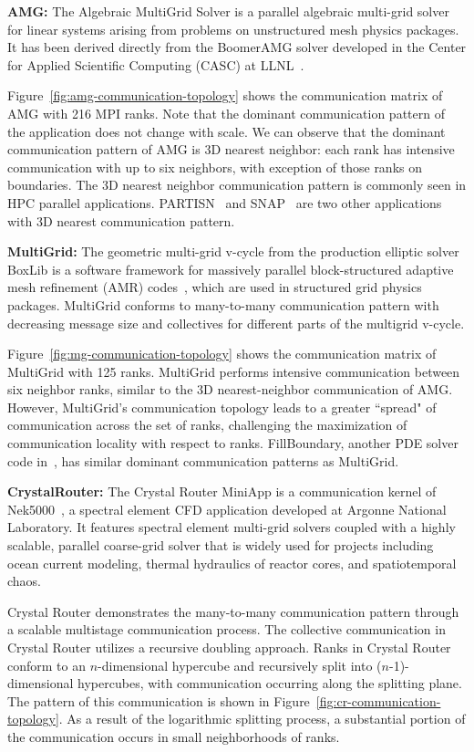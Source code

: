 \textbf{AMG:} The Algebraic MultiGrid Solver is a parallel algebraic multi-grid solver for linear systems arising from problems on unstructured mesh physics packages. It has been derived directly from the BoomerAMG solver developed in the Center for Applied Scientific Computing (CASC) at LLNL~\cite{amg}. 

Figure~\ref{fig:amg-communication-topology} shows the communication matrix of AMG with 216 MPI ranks. Note that the dominant communication pattern of the application does not change with scale. We can observe that the dominant communication pattern of AMG is 3D nearest neighbor: each rank has intensive communication with up to six neighbors, with exception of those ranks on boundaries. The 3D nearest neighbor communication pattern is commonly seen in HPC parallel applications. PARTISN~\cite{partisn} and SNAP~\cite{snap} are two other applications with 3D nearest communication pattern. 


\textbf{MultiGrid:} The geometric multi-grid v-cycle from the production elliptic solver BoxLib is a software framework for massively parallel block-structured adaptive mesh refinement (AMR) codes~\cite{boxlib}, which are used in structured grid physics packages. MultiGrid conforms to many-to-many communication pattern with decreasing message size and collectives for different parts of the multigrid v-cycle. 

Figure~\ref{fig:mg-communication-topology} shows the communication matrix of MultiGrid with 125 ranks. MultiGrid performs intensive communication between six neighbor ranks, similar to the 3D nearest-neighbor communication of AMG. However, MultiGrid's communication topology leads to a greater ``spread" of communication across the set of ranks, challenging the maximization of communication locality with respect to ranks. FillBoundary, another PDE solver code in~\cite{boxlib}, has similar dominant communication patterns as MultiGrid.  


\textbf{CrystalRouter:} The Crystal Router MiniApp is a communication kernel of Nek5000~\cite{nek5000}, a spectral element CFD application developed at Argonne National Laboratory. It features spectral element multi-grid solvers coupled with a highly scalable, parallel coarse-grid solver that is widely used for projects including ocean current modeling, thermal hydraulics of reactor cores, and spatiotemporal chaos. 

Crystal Router demonstrates the many-to-many communication pattern 
through a scalable multistage communication process. The collective communication in Crystal Router utilizes a recursive doubling approach. Ranks in Crystal Router conform to an $n$-dimensional hypercube and recursively split into ($n$-1)-dimensional hypercubes, with communication occurring along the splitting plane. The pattern of this communication is shown in Figure~\ref{fig:cr-communication-topology}. As a result of the logarithmic splitting process, a substantial portion of the communication occurs in small neighborhoods of ranks.


